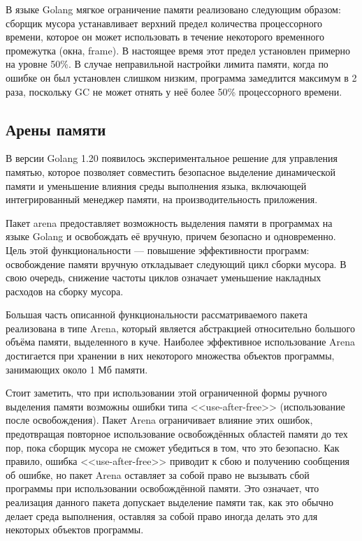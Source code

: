 В языке Golang мягкое ограничение памяти реализовано следующим образом: сборщик мусора устанавливает верхний предел количества процессорного времени, которое он может использовать в течение некоторого временного промежутка (окна, frame). В настоящее время этот предел установлен примерно на уровне 50\%. В случае неправильной настройки лимита памяти, когда по ошибке он был установлен слишком низким, программа замедлится максимум в 2 раза, поскольку GC не может отнять у неё более 50\% процессорного времени. \cite{golang_gc_guide}


\subsection{Арены памяти}

В версии Golang 1.20 появилось экспериментальное решение для управления памятью, которое позволяет совместить безопасное выделение динамической памяти и уменьшение влияния среды выполнения языка, включающей интегрированный менеджер памяти, на производительность приложения.


Пакет arena предоставляет возможность выделения памяти в программах на языке Golang и освобождать её вручную, причем безопасно и одновременно. Цель этой функциональности --- повышение эффективности программ: освобождение памяти вручную откладывает следующий цикл сборки мусора. В свою очередь, снижение частоты циклов означает уменьшение накладных расходов на сборку мусора. \cite{golang_arena_cource}

Большая часть описанной функциональности рассматриваемого пакета реализована в типе Arena, который является абстракцией относительно большого объёма памяти, выделенного в куче. Наиболее эффективное использование Arena достигается при хранении в них некоторого множества объектов программы, занимающих около 1 Мб памяти. \cite{golang_arena_cource} \cite{golang_arena_proposal}

Стоит заметить, что при использовании этой ограниченной формы ручного выделения памяти возможны ошибки типа <<use-after-free>> (использование после освобождения). Пакет Arena ограничивает влияние этих ошибок, предотвращая повторное использование освобождённых областей памяти до тех пор, пока сборщик мусора не сможет убедиться в том, что это безопасно. Как правило, ошибка <<use-after-free>> приводит к сбою и получению сообщения об ошибке, но пакет Arena оставляет за собой право не вызывать сбой программы при использовании освобождённой памяти. Это означает, что реализация данного пакета допускает выделение памяти так, как это обычно делает среда выполнения, оставляя за собой право иногда делать это для некоторых объектов программы.~\cite{golang_arena_cource}

